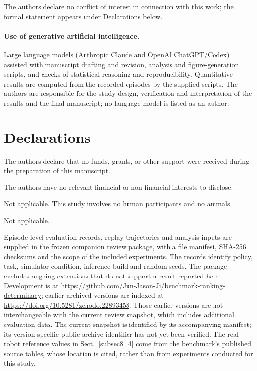 \documentclass[pdflatex,iicol,sn-apa]{sn-jnl}
\theoremstyle{remark}
\begin{document}

The authors declare no conflict of interest in connection with this work; the formal statement
appears under Declarations below.

\paragraph{Use of generative artificial intelligence.}
Large language models (Anthropic Claude and OpenAI ChatGPT/Codex) assisted with manuscript drafting
and revision, analysis and figure-generation scripts, and checks of statistical reasoning and
reproducibility. Quantitative results are computed from the recorded episodes by the supplied
scripts. The authors are responsible for the study design, verification and interpretation of the
results and the final manuscript; no language model is listed as an author.

\section*{Declarations}

The authors declare that no funds, grants, or other support were received during the preparation of
this manuscript.

The authors have no relevant financial or non-financial interests to disclose.

Not applicable. This study involves no human participants and no animals.

Not applicable.

Episode-level evaluation records, replay trajectories and analysis inputs are supplied in the frozen
companion review package, with a file manifest, SHA-256 checksums and the scope of the included
experiments. The records identify policy, task, simulator condition, inference build and random
seeds. The package excludes ongoing extensions that do not support a result reported here.
Development is at \url{https://github.com/Jun-Jason-Ji/benchmark-ranking-determinacy}; earlier
archived versions are indexed at \url{https://doi.org/10.5281/zenodo.22893458}. Those earlier
versions are not interchangeable with the current review snapshot, which includes additional
evaluation data. The current snapshot is identified by its accompanying manifest; its
version-specific public archive identifier has not yet been verified. The real-robot reference
values in Sect.~\ref{subsec8_4} come from the benchmark's published source tables, whose location
is cited, rather than from experiments conducted for this study.
\end{document}
